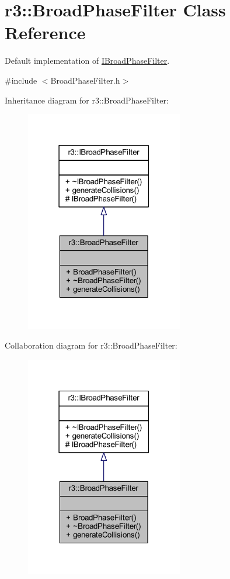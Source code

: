 \hypertarget{classr3_1_1_broad_phase_filter}{}\section{r3\+:\+:Broad\+Phase\+Filter Class Reference}
\label{classr3_1_1_broad_phase_filter}


Default implementation of \mbox{\hyperlink{classr3_1_1_i_broad_phase_filter}{I\+Broad\+Phase\+Filter}}.  




{\ttfamily \#include $<$Broad\+Phase\+Filter.\+h$>$}



Inheritance diagram for r3\+:\+:Broad\+Phase\+Filter\+:\nopagebreak
\begin{figure}[H]
\begin{center}
\leavevmode
\includegraphics[width=195pt]{classr3_1_1_broad_phase_filter__inherit__graph}
\end{center}
\end{figure}


Collaboration diagram for r3\+:\+:Broad\+Phase\+Filter\+:\nopagebreak
\begin{figure}[H]
\begin{center}
\leavevmode
\includegraphics[width=195pt]{classr3_1_1_broad_phase_filter__coll__graph}
\end{center}
\end{figure}

